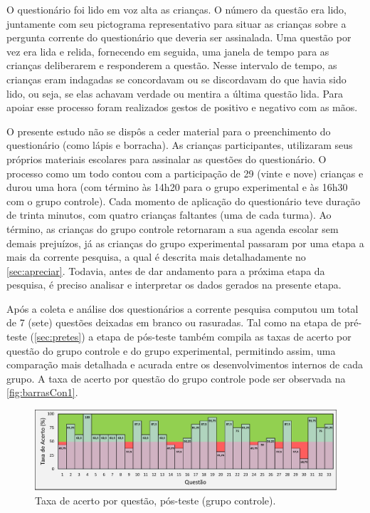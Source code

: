 O questionário foi lido em voz alta as crianças. O número da questão era lido, juntamente com seu pictograma representativo para situar as crianças sobre a pergunta corrente do questionário que deveria ser assinalada. Uma questão por vez era lida e relida, fornecendo em seguida, uma janela de tempo para as crianças deliberarem e responderem a questão. Nesse intervalo de tempo, as crianças eram indagadas se concordavam ou se discordavam do que havia sido lido, ou seja, se elas achavam verdade ou mentira a última questão lida. Para apoiar esse processo foram realizados gestos de positivo e negativo com as mãos.

O presente estudo não se dispôs a ceder material para o preenchimento do questionário (como lápis e borracha). As crianças participantes, utilizaram seus próprios materiais escolares para assinalar as questões do questionário. O processo como um todo contou com a participação de 29 (vinte e nove) crianças e durou uma hora (com término às 14h20 para o grupo experimental e às 16h30 com o grupo controle). Cada momento de aplicação do questionário teve duração de trinta minutos, com quatro crianças faltantes (uma de cada turma). Ao término, as crianças do grupo controle retornaram a sua agenda escolar sem demais prejuízos, já as crianças do grupo experimental passaram por uma etapa a mais da corrente pesquisa, a qual é descrita mais detalhadamente no \autoref{sec:apreciar}. Todavia, antes de dar andamento para a próxima etapa da pesquisa, é preciso analisar e interpretar os dados gerados na presente etapa. 

Após a coleta e análise dos questionários a corrente pesquisa computou um total de 7 (sete) questões deixadas em branco ou rasuradas. Tal como na etapa de pré-teste (\autoref{sec:pretes}) a etapa de pós-teste também compila as taxas de acerto por questão do grupo controle e do grupo experimental, permitindo assim, uma comparação mais detalhada e acurada entre os desenvolvimentos internos de cada grupo. A taxa de acerto por questão do grupo controle pode ser observada na  \autoref{fig:barrasCon1}.


\begin{figure}[htb]

    \caption{\label{fig:barrasCon1}Taxa de acerto por questão, pós-teste (grupo controle).}
    \includegraphics[width=\linewidth]{./Visuais/NotasControlePOS.pdf}
  
\end{figure}

